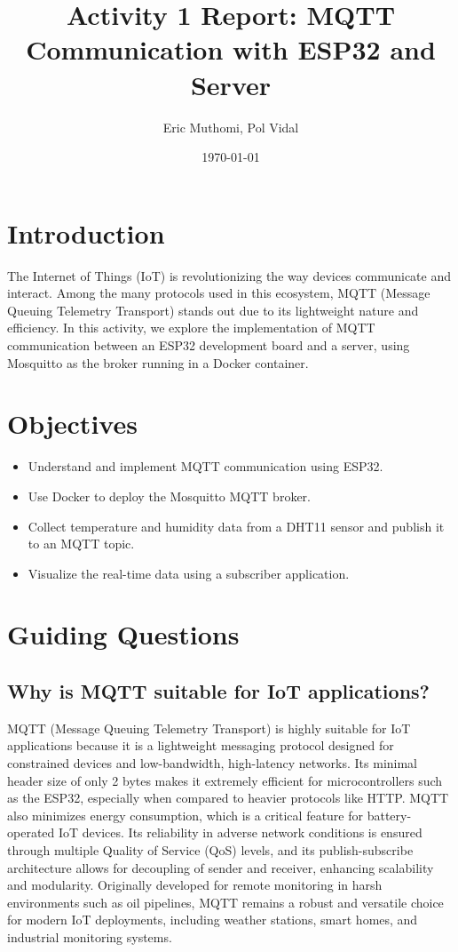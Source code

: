 \documentclass[a4paper,12pt]{article}
\title{Activity 1 Report: MQTT Communication with ESP32 and Server}
\author{Eric Muthomi, Pol Vidal}
\date{\today}
\begin{document}
\maketitle

\section{Introduction}
The Internet of Things (IoT) is revolutionizing the way devices communicate and interact. Among the many protocols used in this ecosystem, MQTT (Message Queuing Telemetry Transport) stands out due to its lightweight nature and efficiency. In this activity, we explore the implementation of MQTT communication between an ESP32 development board and a server, using Mosquitto as the broker running in a Docker container.

\section{Objectives}
\begin{itemize}
    \item Understand and implement MQTT communication using ESP32.
    \item Use Docker to deploy the Mosquitto MQTT broker.
    \item Collect temperature and humidity data from a DHT11 sensor and publish it to an MQTT topic.
    \item Visualize the real-time data using a subscriber application.
\end{itemize}

\section{Guiding Questions}

\subsection*{Why is MQTT suitable for IoT applications?}
MQTT (Message Queuing Telemetry Transport) is highly suitable for IoT applications because it is a lightweight messaging protocol designed for constrained devices and low-bandwidth, high-latency networks. Its minimal header size of only 2 bytes makes it extremely efficient for microcontrollers such as the ESP32, especially when compared to heavier protocols like HTTP. MQTT also minimizes energy consumption, which is a critical feature for battery-operated IoT devices. Its reliability in adverse network conditions is ensured through multiple Quality of Service (QoS) levels, and its publish-subscribe architecture allows for decoupling of sender and receiver, enhancing scalability and modularity. Originally developed for remote monitoring in harsh environments such as oil pipelines, MQTT remains a robust and versatile choice for modern IoT deployments, including weather stations, smart homes, and industrial monitoring systems.
\end{document}
